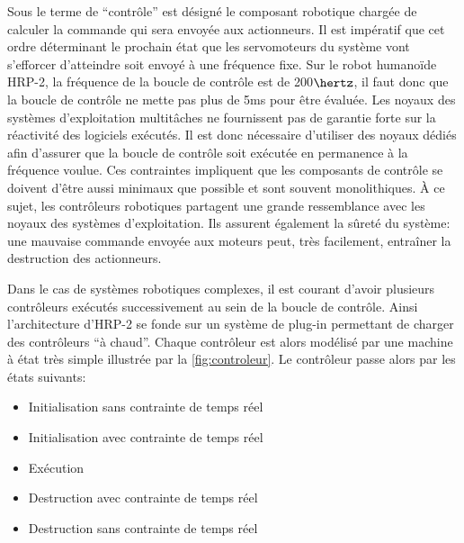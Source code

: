 Sous le terme de ``contrôle'' est désigné le composant robotique
chargée de calculer la commande qui sera envoyée aux actionneurs. Il
est impératif que cet ordre déterminant le prochain état que les
servomoteurs du système vont s'efforcer d'atteindre soit envoyé à une
fréquence fixe. Sur le robot humanoïde HRP-2, la
fréquence de la boucle de contrôle est de 200$\hertz$, il faut donc
que la boucle de contrôle ne mette pas plus de 5ms pour être
évaluée. Les noyaux des systèmes d'exploitation multitâches ne
fournissent pas de garantie forte sur la réactivité des logiciels
exécutés. Il est donc nécessaire d'utiliser des noyaux dédiés afin
d'assurer que la boucle de contrôle soit exécutée en permanence à la
fréquence voulue. Ces contraintes impliquent que les composants de
contrôle se doivent d'être aussi minimaux que possible et sont souvent
monolithiques. À ce sujet, les contrôleurs robotiques partagent une
grande ressemblance avec les noyaux des systèmes d'exploitation. Ils
assurent également la sûreté du système: une mauvaise commande envoyée
aux moteurs peut, très facilement, entraîner la destruction des
actionneurs.

Dans le cas de systèmes robotiques complexes, il est courant d'avoir
plusieurs contrôleurs exécutés successivement au sein de la boucle de
contrôle. Ainsi l'architecture d'HRP-2 se fonde sur un système de
plug-in permettant de charger des contrôleurs ``à chaud''. Chaque
contrôleur est alors modélisé par une machine à état très simple
illustrée par la \autoref{fig:controleur}. Le contrôleur passe alors
par les états suivants:

\begin{itemize}
\item Initialisation sans contrainte de temps réel
\item Initialisation avec contrainte de temps réel
\item Exécution
\item Destruction avec contrainte de temps réel
\item Destruction sans contrainte de temps réel
\end{itemize}

